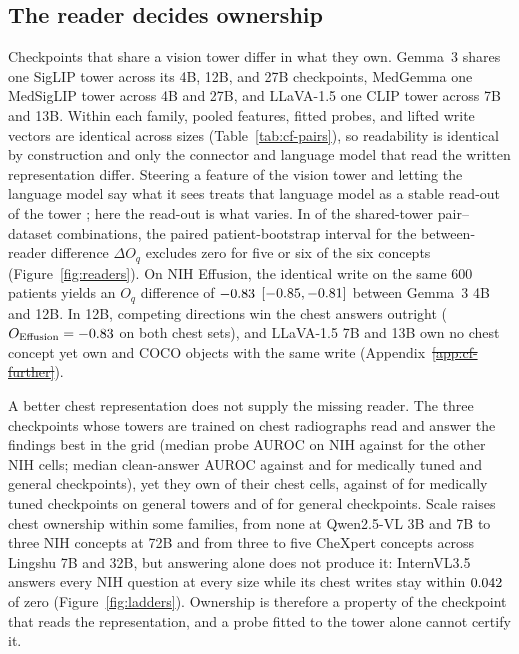 \documentclass{article}
\makeatletter
\providecommand{\DIFaddtex}[1]{{\protect\color{blue}\uwave{#1}}} %
\providecommand{\DIFdeltex}[1]{{\protect\color{red}\sout{#1}}} %
\providecommand{\DIFaddbegin}{} %
\providecommand{\DIFaddend}{} %
\providecommand{\DIFdelbegin}{} %
\providecommand{\DIFdelend}{} %
\providecommand{\DIFadd}[1]{\texorpdfstring{\DIFaddtex{#1}}{#1}} %
\providecommand{\DIFdel}[1]{\texorpdfstring{\DIFdeltex{#1}}{}} %
\providecommand{\DIFscaledelfig}{0.5}
\newlength{\DIFdelgraphicswidth} %
\newlength{\DIFdelgraphicsheight} %
\providecommand{\DIFaddincludegraphics}[2][]{{\color{blue}\fbox{\DIFOincludegraphics[#1]{#2}}}} %
\providecommand{\DIFdelincludegraphics}[2][]{%
\sbox{\DIFdelgraphicsbox}{\DIFOincludegraphics[#1]{#2}}%
\settoboxwidth{\DIFdelgraphicswidth}{\DIFdelgraphicsbox} %
\settoboxtotalheight{\DIFdelgraphicsheight}{\DIFdelgraphicsbox} %
\scalebox{\DIFscaledelfig}{%
\parbox[b]{\DIFdelgraphicswidth}{\usebox{\DIFdelgraphicsbox}\\[-\baselineskip] \rule{\DIFdelgraphicswidth}{0em}}\llap{\resizebox{\DIFdelgraphicswidth}{\DIFdelgraphicsheight}{%
\setlength{\unitlength}{\DIFdelgraphicswidth}%
\begin{picture}(1,1)%
\thicklines\linethickness{2pt} %
{\color[rgb]{1,0,0}\put(0,0){\framebox(1,1){}}}%
{\color[rgb]{1,0,0}\put(0,0){\line( 1,1){1}}}%
{\color[rgb]{1,0,0}\put(0,1){\line(1,-1){1}}}%
\end{picture}%
}\hspace*{3pt}}} %
} %
\DeclareRobustCommand{\DIFaddbegin}{\DIFOaddbegin \let\includegraphics\DIFaddincludegraphics} %
\DeclareRobustCommand{\DIFaddend}{\DIFOaddend \let\includegraphics\DIFOincludegraphics} %
\DeclareRobustCommand{\DIFdelbegin}{\DIFOdelbegin \let\includegraphics\DIFdelincludegraphics} %
\DeclareRobustCommand{\DIFdelend}{\DIFOaddend \let\includegraphics\DIFOincludegraphics} %
\let\sout@orig\sout %
\renewcommand{\sout}[1]{\ifmmode\text{\sout@orig{\ensuremath{#1}}}\else\sout@orig{#1}\fi} %
\makeatother
\begin{document}
\subsection{The reader decides ownership}
\label{sec:reader}

Checkpoints that share a vision tower differ in what they own. Gemma~3 shares one SigLIP tower across its 4B, 12B, and 27B checkpoints, MedGemma one MedSigLIP tower across 4B and 27B, and LLaVA-1.5 one CLIP tower across 7B and 13B. Within each family, pooled features, fitted probes, and lifted write vectors are identical across sizes (Table~\ref{tab:cf-pairs}), so readability is identical by construction and only the connector and language model that read the written representation differ. Steering a feature of the vision tower and letting the language model say what it sees treats that language model as a stable read-out of the tower \citep{ferrando2026explain}; here the read-out is what varies. In \cfPairsFiveOrSix{} of the \cfPairsN{} shared-tower pair--dataset combinations, the paired patient-bootstrap interval for the between-reader difference $\Delta O_q$ excludes zero for five or six of the six concepts (Figure~\ref{fig:readers}). On NIH Effusion, the identical write on the same 600 patients yields an $O_q$ difference of $-0.83$ $[-0.85,-0.81]$ between Gemma~3 4B and 12B. In 12B, competing directions win the chest answers outright ($O_{\mathrm{Effusion}}=-0.83$ on both chest sets), and LLaVA-1.5 7B and 13B own no chest concept yet own \cfLlavaSevenCoco{} and \cfLlavaThirteenCoco{} COCO objects with the same write (Appendix~\DIFdelbegin \DIFdel{\ref{app:cf-further}}\DIFdelend \DIFaddbegin \DIFadd{\ref{app:cf-reader}}\DIFaddend ).

A better chest representation does not supply the missing reader. The three checkpoints whose towers are trained on chest radiographs read and answer the findings best in the grid (median probe AUROC \cfSpecTowerProbeAuroc{} on NIH against \cfSpecRestProbeAuroc{} for the other NIH cells; median clean-answer AUROC \cfSpecTowerAnsAuroc{} against \cfSpecMedAnsAuroc{} and \cfSpecGenAnsAuroc{} for medically tuned and general checkpoints), yet they own \cfSpecTowerOwned{} of their \cfSpecTowerN{} chest cells, against \cfSpecMedOwned{} of \cfSpecMedN{} for medically tuned checkpoints on general towers and \cfSpecGenOwned{} of \cfSpecGenN{} for general checkpoints. Scale raises chest ownership within some families, from none at Qwen2.5-VL 3B and 7B to three NIH concepts at 72B and from three to five CheXpert concepts across Lingshu 7B and 32B, but answering alone does not produce it: InternVL3.5 answers every NIH question at every size while its chest writes stay within $0.042$ of zero (Figure~\ref{fig:ladders}). Ownership is therefore a property of the checkpoint that reads the representation, and a probe fitted to the tower alone cannot certify it.
\end{document}
